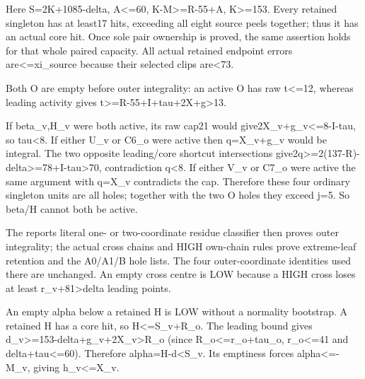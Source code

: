 \documentclass[10pt,a4paper]{article}
\theoremstyle{definition}
\begin{document}
Here S=\allowbreak{}2K+\allowbreak{}1085-delta,\allowbreak{} A\textless=\allowbreak{}60,\allowbreak{} K-M\textgreater=\allowbreak{}R-55+\allowbreak{}A,\allowbreak{}
K\textgreater=\allowbreak{}153. Every retained singleton has at least17 hits,\allowbreak{}
exceeding all eight source peels together; thus it has an actual core
hit. Once sole pair ownership is proved,\allowbreak{} the same assertion holds for
that whole paired capacity. All actual retained endpoint errors
are\textless=\allowbreak{}xi\_\allowbreak{}source because their selected clips are\textless73.

Both O are empty before outer integrality: an active O has raw
t\textless=\allowbreak{}12,\allowbreak{} whereas leading activity gives
t\textgreater=\allowbreak{}R-55+\allowbreak{}I+\allowbreak{}tau+\allowbreak{}2X+\allowbreak{}g\textgreater13.

If beta\_\allowbreak{}v,\allowbreak{}H\_\allowbreak{}v were both active,\allowbreak{} its raw cap21 would
give2X\_\allowbreak{}v+\allowbreak{}g\_\allowbreak{}v\textless=\allowbreak{}8-I-tau,\allowbreak{} so tau\textless8. If either U\_\allowbreak{}v or
C6\_\allowbreak{}o were active then q=\allowbreak{}X\_\allowbreak{}v+\allowbreak{}g\_\allowbreak{}v would be integral. The two opposite
leading/core shortcut intersections
give2q\textgreater=\allowbreak{}2(137-R)-delta\textgreater=\allowbreak{}78+\allowbreak{}I-tau\textgreater70,\allowbreak{}
contradiction q\textless8. If either V\_\allowbreak{}v or C7\_\allowbreak{}o were active the same
argument with q=\allowbreak{}X\_\allowbreak{}v contradicts the cap. Therefore these four ordinary
singleton units are all holes; together with the two O holes they exceed
j=\allowbreak{}5. So beta/H cannot both be active.

The report\textquotesingle s literal one- or two-coordinate residue
classifier then proves outer integrality; the actual cross chains and
HIGH own-chain rules prove extreme-leaf retention and the A0/A1/B hole
lists. The four outer-coordinate identities used there are unchanged. An
empty cross centre is LOW because a HIGH cross loses at least
r\_\allowbreak{}v+\allowbreak{}81\textgreater delta leading points.

An empty alpha below a retained H is LOW without a normality bootstrap.
A retained H has a core hit,\allowbreak{} so H\textless=\allowbreak{}S\_\allowbreak{}v+\allowbreak{}R\_\allowbreak{}o. The leading bound
gives d\_\allowbreak{}v\textgreater=\allowbreak{}153-delta+\allowbreak{}g\_\allowbreak{}v+\allowbreak{}2X\_\allowbreak{}v\textgreater R\_\allowbreak{}o (since
R\_\allowbreak{}o\textless=\allowbreak{}r\_\allowbreak{}o+\allowbreak{}tau\_\allowbreak{}o,\allowbreak{} r\_\allowbreak{}o\textless=\allowbreak{}41 and delta+\allowbreak{}tau\textless=\allowbreak{}60).
Therefore alpha=\allowbreak{}H-d\textless S\_\allowbreak{}v. Its emptiness forces
alpha\textless=\allowbreak{}-M\_\allowbreak{}v,\allowbreak{} giving h\_\allowbreak{}v\textless=\allowbreak{}X\_\allowbreak{}v.
\end{document}
